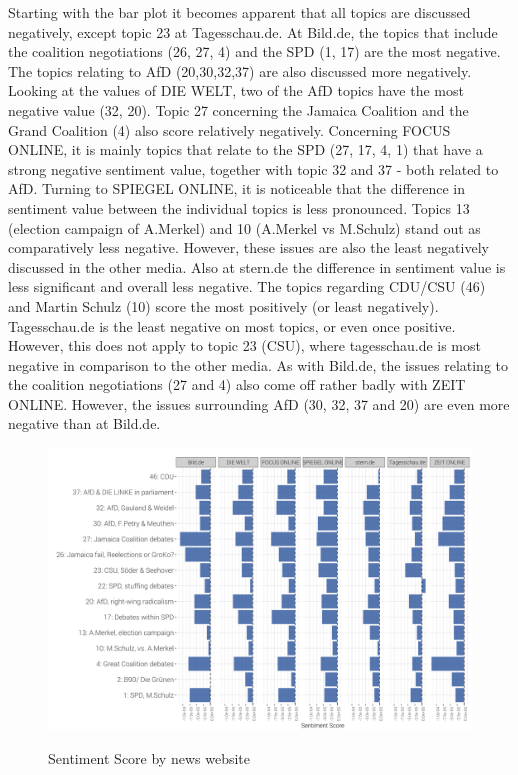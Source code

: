 \documentclass[12pt,a4paper,notitlepage]{article}
\begin{document}
Starting with the bar plot it becomes apparent that all topics are discussed negatively, except topic 23 at Tagesschau.de. At Bild.de, the topics that include the coalition negotiations (26, 27, 4) and the SPD (1, 17) are the most negative. The topics relating to AfD (20,30,32,37) are also discussed more negatively. Looking at the values of DIE WELT, two of the AfD topics have the most negative value (32, 20). Topic 27 concerning the Jamaica Coalition and the Grand Coalition (4) also score relatively negatively. Concerning FOCUS ONLINE, it is mainly topics that relate to the SPD (27, 17, 4, 1) that have a strong negative sentiment value, together with topic 32 and 37 - both related to AfD. Turning to SPIEGEL ONLINE, it is noticeable that the difference in sentiment value between the individual topics is less pronounced. Topics 13 (election campaign of A.Merkel) and 10 (A.Merkel vs M.Schulz) stand out as comparatively less negative. However, these issues are also the least negatively discussed in the other media. Also at stern.de the difference in sentiment value is less significant and overall less negative. The topics regarding CDU/CSU (46) and Martin Schulz (10) score the most positively (or least negatively). Tagesschau.de is the least negative on most topics, or even once positive. However, this does not apply to topic 23 (CSU), where tagesschau.de is most negative in comparison to the other media. As with Bild.de, the issues relating to the coalition negotiations (27 and 4) also come off rather badly with ZEIT ONLINE. However, the issues surrounding AfD (30, 32, 37 and 20) are even more negative than at Bild.de. 

\begin{figure}[H]
	\caption{Sentiment Score by news website}
	\begin{center}
			\includegraphics[width=\textwidth,keepaspectratio]{../figs/sentscore_site.png}
			\label{fig_sentscore_site}
	\end{center}
\end{figure}
\end{document}
